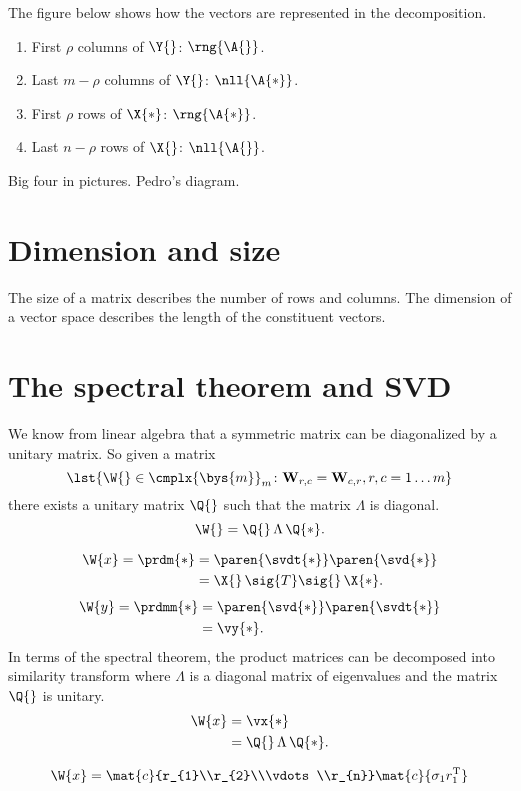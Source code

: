 The figure below shows how the vectors are represented in the decomposition.
\begin{enumerate}
\item First $\rho$ columns of $\Y{}$: $\rng{\A{}}$.
\item Last $m-\rho$ columns of $\Y{}$: $\nll{\A{*}}$.
\item First $\rho$ rows of $\X{*}$: $\rng{\A{*}}$.
\item Last $n-\rho$ rows of $\X{}$: $\nll{\A{}}$.
\end{enumerate}

Big four in pictures. Pedro's diagram.


\section{Dimension and size}
The size of a matrix describes the number of rows and columns. The dimension of  a vector space describes the length of the constituent vectors.

\section{The spectral theorem and SVD}
We know from linear algebra that a symmetric matrix can be diagonalized by a unitary matrix. So given a matrix
\begin{equation}
  \lst{\W{} \in \cmplx{\bys{m}}_{m}\colon\mathbf{W}_{r,c}=\mathbf{W}_{c,r}, r,c=1\dots m}
\end{equation}
there exists a unitary matrix $\Q{}$ such that the matrix $\Lambda$ is diagonal.
\begin{equation}
  \W{} = \Q{}\,\Lambda\,\Q{*}.
\end{equation}

\begin{equation}
  \begin{split}
    \W{x} = \prdm{*} &= \paren{\svdt{*}}\paren{\svd{*}} \\
    &= \X{}\,\sig{T}\sig{}\,\X{*}.
  \end{split}
\end{equation}
\begin{equation}
  \begin{split}
    \W{y} = \prdmm{*} &= \paren{\svd{*}}\paren{\svdt{*}}\\
    & = \vy{*}.
  \end{split}
\end{equation}In terms of the spectral theorem, the product matrices can be decomposed into similarity transform where $\Lambda$ is a diagonal matrix of eigenvalues and the matrix $\Q{}$ is unitary.
\begin{equation}
  \begin{split}
    \W{x} &= \vx{*}\\
          &= \Q{}\,\Lambda\,\Q{*}.
  \end{split}
\end{equation}

\begin{equation}
  \W{x} = \mat{c}{r_{1}\\r_{2}\\\vdots\\r_{n}} \mat{c}{\sigma_{1}r_{1}^{\mathrm{T}}}
\end{equation}


\endinput